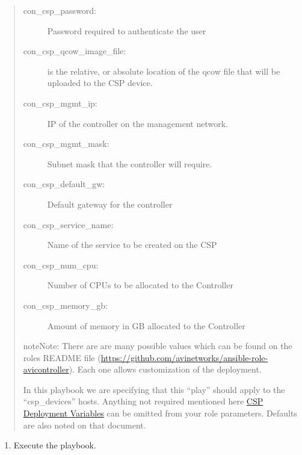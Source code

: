 \documentclass[letterpaper,10pt,english]{sphinxmanual}
\begin{document}
\begin{quote}
\begin{description}
\item[{con\_csp\_password:}] \leavevmode
Password required to authenticate the user

\item[{con\_csp\_qcow\_image\_file:}] \leavevmode
is the relative, or absolute location of the qcow file that will be uploaded to the CSP device.

\item[{con\_csp\_mgmt\_ip:}] \leavevmode
IP of the controller on the management network.

\item[{con\_csp\_mgmt\_mask:}] \leavevmode
Subnet mask that the controller will require.

\item[{con\_csp\_default\_gw:}] \leavevmode
Default gateway for the controller

\item[{con\_csp\_service\_name:}] \leavevmode
Name of the service to be created on the CSP

\item[{con\_csp\_num\_cpu:}] \leavevmode
Number of CPUs to be allocated to the Controller

\item[{con\_csp\_memory\_gb:}] \leavevmode
Amount of memory in GB allocated to the Controller

\end{description}

\begin{sphinxadmonition}{note}{Note:}
There are are many possible values which can be found on the roles README file (\url{https://github.com/avinetworks/ansible-role-avicontroller}). Each one allows customization of the deployment.
\end{sphinxadmonition}

In this playbook we are specifying that this ``play'' should apply to the ``csp\_devices'' hosts. Anything not required mentioned here \href{https://github.com/avinetworks/ansible-role-avicontroller\#csp-deployment-variables}{CSP Deployment Variables} can be omitted from your role parameters. Defaults are also noted on that document.
\end{quote}
\begin{enumerate}
\item {} 
Execute the playbook.

\end{enumerate}
\end{document}
